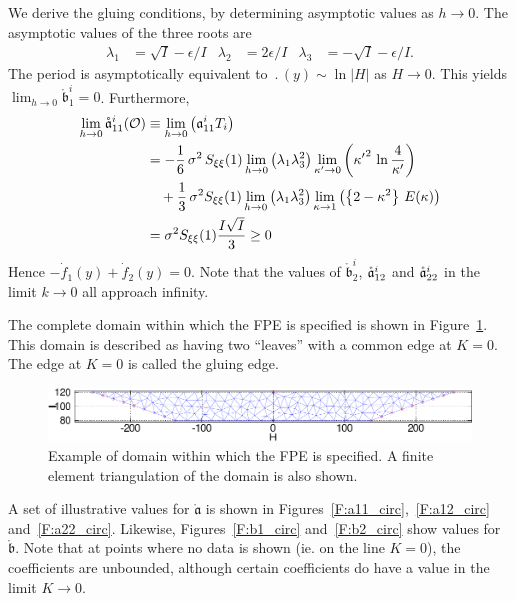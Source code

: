 We derive the gluing conditions, by determining asymptotic values as $h \to 0$. The asymptotic values of the three roots are
\begin{align*}
\lambda_1&=\sqrt I - \epsilon/I & \lambda_2&=2\epsilon/I & \lambda_3&=-\sqrt I - \epsilon/I.
\end{align*}
The period is asymptotically equivalent to $\period(y) \sim \ln |H|$ as $H \to 0$. This yields $\lim_{h \to 0}\mathring{\mathfrak{b}}_1^i = 0$.
Furthermore,
\begin{align}
\lim_{h \to 0} \mathring{\mathfrak a}_{11}^{i}({\mathcal{O}})&\equiv\lim_{h \to 0} \left(\mathfrak a_{11}^i T_i\right) \notag\\
&= - \frac{1}{6}\,{\sigma}^2\,S_{\xi\xi}(1) \lim_{h \to 0} \left(\lambda_1  \lambda_{3}^2 \right) \lim_{\kappa^\prime \to 0} \left({\kappa^\prime}^2 \, \ln \frac{4}{\kappa^{\prime}} \right) \notag\\
&\quad + \frac{1}{3}\,{\sigma}^2S_{\xi\xi}(1) \lim_{h \to 0} \left(\lambda_1 \lambda_{3}^2 \right) \lim_{\kappa \to 1} \left(\left\{2-{\kappa}^2\right\}\, E(\kappa)\right) \notag\\
& = \sigma^2 S_{\xi\xi}(1) \frac{I \sqrt{I}}{3} \geq 0\label{E:lim drift_11}
\end{align}
Hence $-\dot f_1(y) +\dot f_2(y) = 0$.
Note that the values of $\mathring{\mathfrak b}_2^i$, $\mathring{\mathfrak a}_{12}^i$ and $\mathring{\mathfrak a}_{22}^i$ in the limit $k \to 0$ all approach infinity.

The complete domain within which the FPE is specified is shown in Figure~\ref{F:domain}. This domain is described as having two ``leaves'' with a common edge at $K=0$. The edge at $K=0$ is called the gluing edge.

\begin{figure}
\begin{center}
\includegraphics[width=\textwidth*7/8]{figures/domain_crop}
\caption{Example of domain within which the FPE is specified. A finite element triangulation of the domain is also shown.}
\label{F:domain}
\end{center}
\end{figure}

A set of illustrative values for $\mathring{\mathfrak a}$ is shown in Figures~\ref{F:a11_circ},~\ref{F:a12_circ} and~\ref{F:a22_circ}. Likewise, Figures~\ref{F:b1_circ} and~\ref{F:b2_circ} show values for $\mathring{\mathfrak b}$. Note that at points where no data is shown (ie. on the line $K=0$), the coefficients are unbounded, although certain coefficients do have a value in the limit $K \to 0$.

